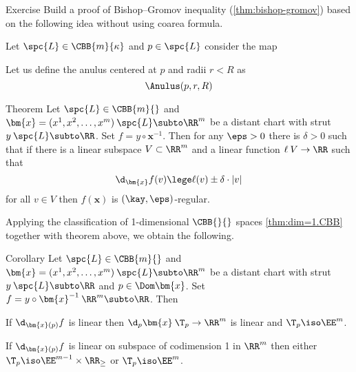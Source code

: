 \begin{thm}{Exercise}
Build a proof of Bishop--Gromov inequality (\ref{thm:bishop-gromov}) based on the following idea without using coarea formula.

Let $\spc{L}\in \CBB{m}{\kappa}$ and $p\in\spc{L}$
consider the map 

Let us define the anulus centered at $p$ and radii $r<R$
as
\[\Anulus(p,r,R)\]

\end{thm}

















\begin{thm}{Theorem}\label{thm:reg-point-stable}
Let $\spc{L}\in\CBB{m}{}$
and $\bm{x}=(x^1,x^2,\dots,x^m)\:\spc{L}\subto\RR^m$ be a distant chart with strut $y\:\spc{L}\subto\RR$.
Set $f=y\circ\bm{x}^{-1}$.  
Then for any $\eps>0$ there is $\delta>0$ such that
if there is a linear subspace $V\subset \RR^m$ 
and a linear function $\ell\:V\to\RR$
such that
\[\d_{\bm{x}}f(v)\lege\ell(v)\pm\delta\cdot|v|\]
for all $v\in V$ 
then $f(\bm{x})$ is $(\kay,\eps)$-regular.
\end{thm}

Applying 
the classification of 1-dimensional $\CBB{}{}$ spaces \ref{thm:dim=1.CBB}
together with theorem above,
we obtain the following.

\begin{thm}{Corollary}
Let $\spc{L}\in\CBB{m}{}$
and $\bm{x}=(x^1,x^2,\dots,x^m)\:\spc{L}\subto\RR^m$ be a distant chart with strut $y\:\spc{L}\subto\RR$
and $p\in\Dom\bm{x}$.
Set $f=y\circ\bm{x}^{-1}\:\RR^m\subto \RR$.
Then
\begin{subthm}{}
If $\d_{\bm{x}(p)}f$ is linear 
then  $\d_p\bm{x}\:\T_p\to \RR^m$ is linear and $\T_p\iso \EE^m$.
\end{subthm}

\begin{subthm}{}
If $\d_{\bm{x}(p)}f$ is linear on subspace of codimension 1 in $\RR^m$ then either $\T_p\iso \EE^{m-1}\times \RR_\ge$ or $\T_p\iso \EE^m$.
\end{subthm}
\end{thm}

















